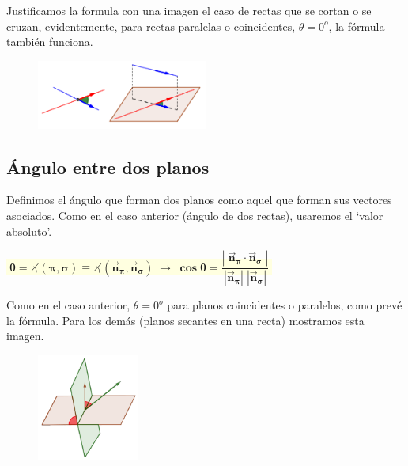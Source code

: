\begin{multicols}{2}
Justificamos la formula con una imagen el caso de rectas que se cortan o se cruzan, evidentemente, para rectas paralelas o coincidentes, $\theta=0^o$, la fórmula también funciona.

	\begin{figure}[H]
		\centering
		\includegraphics[width=0.5\textwidth]{imagenes/imagenes11/T11IM04.png}
	\end{figure}	
\end{multicols}


\subsection{Ángulo entre dos planos}

Definimos el ángulo que forman dos planos como aquel que forman sus vectores asociados. Como en el caso anterior (ángulo de dos rectas),  usaremos el `valor absoluto'. 



\vspace{3mm}\centerline{
\colorbox{LightYellow}{
$\boxed{ \boldsymbol{ \;\theta=\measuredangle(\pi,\sigma)\equiv \measuredangle(\vec n_{\pi},\vec n_{\sigma}) \; \to \; \cos \theta = \dfrac {|\;\vec n_{\pi} \cdot \vec n_{\sigma}\;|}{|\vec n_{\pi}|\;|\vec n_{\sigma}|}\; } }$
}}

\justify

\begin{multicols}{2}
Como en el caso anterior, $\theta=0^o$ para planos coincidentes o paralelos, como prevé la fórmula. Para los demás (planos secantes en una recta) mostramos esta imagen.
	\begin{figure}[H]
		\centering
		\includegraphics[width=0.3\textwidth]{imagenes/imagenes11/T11IM05.png}
	\end{figure}	
\end{multicols}
	
